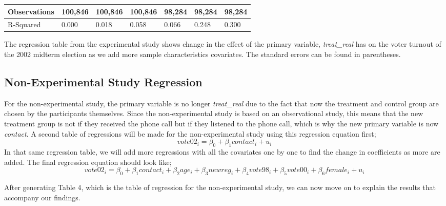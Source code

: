 \documentclass[a4paper]{article}
\begin{document}
\begin{table}[h!]
\begin{tabular}{|l|l|l|l|l|l|l|}
Observations & 100,846   & 100,846   & 100,846    & 98,284     & 98,284     & 98,284     \\ \hline
R-Squared    & 0.000     & 0.018     & 0.058      & 0.066      & 0.248      & 0.300      \\ \hline
\end{tabular}
\RaggedRight The regression table from the experimental study shows change in the effect of the primary variable, \textit{treat\_real} has on the voter turnout of the 2002 midterm election as we add more sample characteristics covariates. The standard errors can be found in parentheses.
\end{table}



\subsection{Non-Experimental Study Regression}

For the non-experimental study, the primary variable is no longer \textit{treat\_real} due to the fact that now the treatment and control group are chosen by the participants themselves. Since the non-experimental study is based on an observational study, this means that the new treatment group is not if they received the phone call but if they listened to the phone call, which is why the new primary variable is now \textit{contact}. A second table of regressions will be made for the non-experimental study using this regression equation first; 
\[vote02_i=\beta_0 +\beta_1contact_i+u_i\] 
In that same regression table, we will add more regressions with all the covariates one by one to find the change in coefficients as more are added. The final regression equation should look like; 
\[vote02_i=\beta_0 +\beta_1contact_i+ \beta_2age_i+ \beta_3newreg_i+ \beta_4vote98_i+ \beta_5vote00_i+ \beta_6female_i+u_i\]

\begin{flushleft}
After generating Table 4, which is the table of regression for the non-experimental study, we can now move on to explain the results that accompany our findings. 
\end{flushleft}
\end{document}
